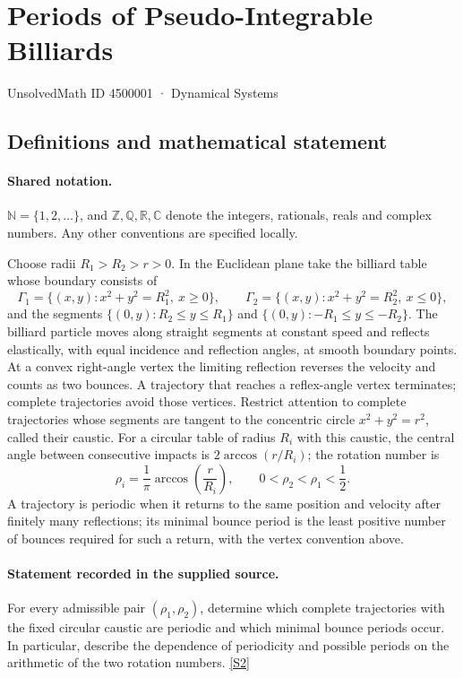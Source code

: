\documentclass[11pt]{article}
\newcommand{\sref}[2]{\hyperlink{source:#1:#2}{[S#2]}}
\begin{document}
\setcounter{section}{4500000}
\section{Periods of Pseudo-Integrable Billiards}\label{4500001}
{\small\sffamily UnsolvedMath ID 4500001 · Dynamical Systems}
\subsection{Definitions and mathematical statement}

\paragraph{Shared notation.}$\mathbb N=\{1,2,\ldots\}$, and $\mathbb Z,\mathbb Q,\mathbb R,\mathbb C$ denote the integers, rationals, reals and complex numbers. Any other conventions are specified locally.


Choose radii \(R_1>R_2>r>0\). In the Euclidean plane take the billiard table whose boundary consists of
\[
\Gamma_1=\{(x,y):x^2+y^2=R_1^2,\ x\ge0\},\qquad
\Gamma_2=\{(x,y):x^2+y^2=R_2^2,\ x\le0\},
\]
and the segments \(\{(0,y):R_2\le y\le R_1\}\) and \(\{(0,y):-R_1\le y\le-R_2\}\). The billiard particle moves along straight segments at constant speed and reflects elastically, with equal incidence and reflection angles, at smooth boundary points. At a convex right-angle vertex the limiting reflection reverses the velocity and counts as two bounces. A trajectory that reaches a reflex-angle vertex terminates; complete trajectories avoid those vertices.
Restrict attention to complete trajectories whose segments are tangent to the concentric circle \(x^2+y^2=r^2\), called their caustic. For a circular table of radius \(R_i\) with this caustic, the central angle between consecutive impacts is \(2\arccos(r/R_i)\); the rotation number is
\[\rho_i=\frac1\pi\arccos\left(\frac r{R_i}\right),\qquad
0<\rho_2<\rho_1<\frac12.\]
A trajectory is periodic when it returns to the same position and velocity after finitely many reflections; its minimal bounce period is the least positive number of bounces required for such a return, with the vertex convention above.
\paragraph{Statement recorded in the supplied source.}
For every admissible pair \((\rho_1,\rho_2)\), determine which complete trajectories with the fixed circular caustic are periodic and which minimal bounce periods occur. In particular, describe the dependence of periodicity and possible periods on the arithmetic of the two rotation numbers. \sref{4500001}{2}
\end{document}
